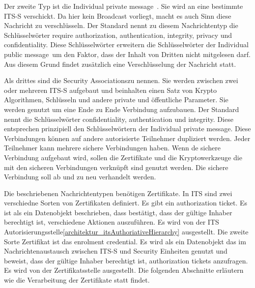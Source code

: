 Der zweite Typ ist die \glqq    Individual private message\grqq~. Sie wird an eine bestimmte \ac{ITS-S} verschickt. Da hier kein Broadcast vorliegt, macht es auch Sinn diese Nachricht zu verschlüsseln. Der Standard nennt zu diesem Nachrichtentyp die Schlüsselwörter require authorization, authentication, integrity, privacy und confidentiality. Diese Schlüsselwörter erweitern die Schlüsselwörter der \glqq Individual public message\grqq~um den Faktor, dass der Inhalt von Dritten nicht mitgelesen darf. Aus diesem Grund findet zusätzlich eine Verschlüsselung der Nachricht statt.

Als drittes sind die \glqq Security Associations\grqq zu nennen. Sie werden zwischen zwei oder mehreren \ac{ITS-S} aufgebaut und beinhalten einen Satz von Krypto Algorithmen, Schlüsseln und andere private und öffentliche Parameter. Sie werden genutzt um eine Ende zu Ende Verbindung aufzubauen.  Der Standard nennt die Schlüsselwörter confidentiality, authentication und integrity.  Diese entsprechen prinzipiell den Schlüsselwörtern der \glqq    Individual private message\grqq. Diese Verbindungen können auf andere autorisierte Teilnehmer dupliziert werden. Jeder Teilnehmer kann mehrere sichere Verbindungen haben. Wenn de sichere Verbindung aufgebaut wird, sollen die Zertifikate und die Kryptowerkzeuge die mit den sicheren Verbindungen verknüpft sind genutzt werden. Die sichere Verbindung soll ab und zu neu verhandelt werden. 

Die beschriebenen Nachrichtentypen benötigen Zertifikate. In \ac{ITS} sind zwei verschiedne Sorten von Zertifikaten definiert. Es gibt ein \glqq  authorization ticket\grqq. Es ist als ein Datenobjekt beschrieben, dass bestätigt, dass der gültige Inhaber berechtigt ist, verschiedene Aktionen auszuführen. Es wird von der ITS Autorisierungsstelle\ref{architektur_itsAuthoriativeHierarchy} ausgestellt. Die zweite Sorte Zertifikat ist das \glqq enrolment credential\grqq. Es wird als ein Datenobjekt das im Nachrichtenaustausch zwischen \ac{ITS-S} und Security Einheiten genutzt und beweist, dass der gültige Inhaber berechtigt ist, authorization tickets anzufragen. Es wird von der Zertifikatsstelle ausgestellt. Die folgenden Abschnitte erläutern wie die Verarbeitung der Zertifikate statt findet.


